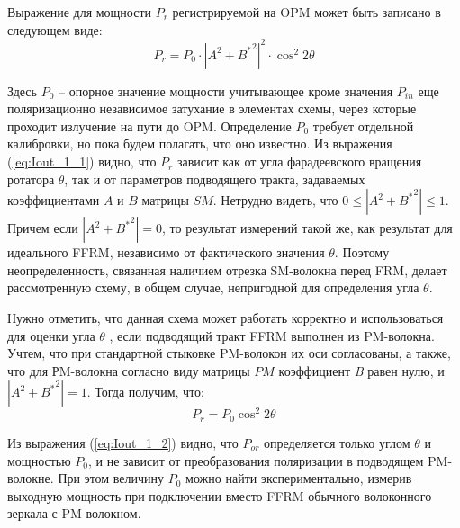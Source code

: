 \documentclass{article}
\begin{document}
Выражение для мощности $P_r$ регистрируемой на OPM может быть записано в следующем виде:
\begin{equation}
	\label{eq:Iout_1_1}
	P_{r} = P_0 \cdot \left| A^2 + {B^*}^2 \right|^2 \cdot \cos^2 2 \theta
\end{equation}

Здесь $P_0$ – опорное значение мощности учитывающее кроме значения $P_{in}$ еще поляризационно независимое затухание в элементах схемы, через которые проходит излучение на пути до OPM.
Определение $P_0$ требует отдельной калибровки, но пока будем полагать, что оно известно.
Из выражения (\ref{eq:Iout_1_1}) видно, что $P_{r}$ зависит как от угла фарадеевского вращения ротатора $\theta$, так и от параметров подводящего тракта, задаваемых коэффициентами $A$ и $B$ матрицы $SM$.
Нетрудно видеть, что  $0\le\left| A^2 + {B^*}^2 \right|\le1$.
Причем если $\left| A^2 + {B^*}^2 \right|=0$, то результат измерений такой же, как результат для идеального FFRM, независимо от фактического значения  $\theta$.
Поэтому неопределенность, связанная наличием отрезка SM-волокна перед FRM, делает рассмотренную схему, в общем случае, непригодной для определения угла $\theta$.

Нужно отметить, что данная схема может работать корректно и использоваться для оценки  угла $\theta$ , если подводящий тракт FFRM выполнен из PM-волокна.
Учтем, что при стандартной стыковке PM-волокон их оси согласованы, а также, что для РM-волокна согласно виду матрицы $PM$ коэффициент \textit{B} равен нулю, и $\left| A^2 + {B^*}^2 \right| = 1$.
Тогда получим, что: 
\begin{equation}
	\label{eq:Iout_1_2}
	P_{r} =  P_0 \cos^2 2 \theta 
\end{equation}

Из выражения (\ref{eq:Iout_1_2}) видно, что $P_{or}$ определяется только углом  $\theta$ и мощностью $P_0$, и не зависит от преобразования поляризации в подводящем PM-волокне.
При этом величину $P_0$ можно найти экспериментально, измерив выходную мощность при подключении вместо FFRM обычного волоконного зеркала с PM-волокном.
\end{document}
